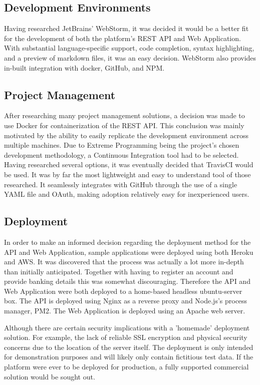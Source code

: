 \subsection{Development Environments}
Having researched JetBrains' WebStorm, it was decided it would be a better fit for the development of both the platform's REST API and Web Application. With substantial language-specific support, code completion, syntax highlighting, and a preview of markdown files, it was an easy decision. WebStorm also provides in-built integration with docker, GitHub, and NPM.

\subsection{Project Management}
After researching many project management solutions, a decision was made to use Docker for containerization of the REST API. This conclusion was mainly motivated by the ability to easily replicate the development environment across multiple machines. Due to Extreme Programming being the project's chosen development methodology, a Continuous Integration tool had to be selected. Having researched several options, it was eventually decided that TravisCI would be used. It was by far the most lightweight and easy to understand tool of those researched. It seamlessly integrates with GitHub through the use of a single YAML file and OAuth, making adoption relatively easy for inexperienced users.

\subsection{Deployment}\label{deployment}
In order to make an informed decision regarding the deployment method for the API and Web Application, sample applications were deployed using both Heroku and AWS. It was discovered that the process was actually a lot more in-depth than initially anticipated. Together with having to register an account and provide banking details this was somewhat discouraging. Therefore the API and Web Application were both deployed to a home-based headless ubuntu-server box. The API is deployed using Nginx as a reverse proxy and Node.js's process manager, PM2. The Web Application is deployed using an Apache web server.

Although there are certain security implications with a 'homemade' deployment solution.  For example, the lack of reliable SSL encryption and physical security concerns due to the location of the server itself. The deployment is only intended for demonstration purposes and will likely only contain fictitious test data. If the platform were ever to be deployed for production, a fully supported commercial solution would be sought out.




